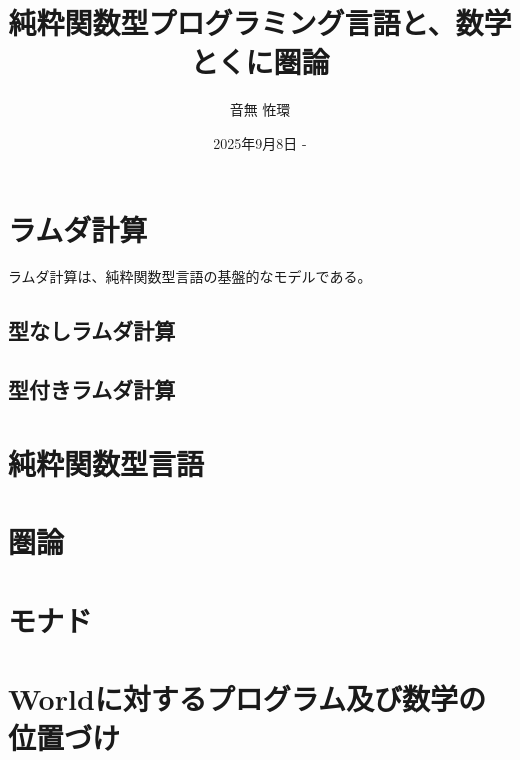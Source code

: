 \documentclass[uplatex,dvipdfmx,a4paper]{jsbook}
\title{純粋関数型プログラミング言語と、数学とくに圏論}
\author{音無 恠環}
\date{2025年9月8日 - }
\begin{document}
    \maketitle

    \chapter{ラムダ計算}
	ラムダ計算は、純粋関数型言語の基盤的なモデルである。
      \section{型なしラムダ計算}
        \section{型付きラムダ計算}

    \chapter{純粋関数型言語}

    \chapter{圏論}

    \chapter{モナド}

    \chapter{Worldに対するプログラム及び数学の位置づけ}
\end{document}
